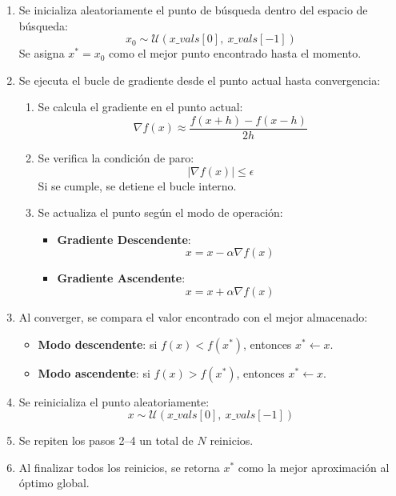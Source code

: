 \documentclass[11pt]{article}
\begin{document}
\begin{enumerate}
    \item Se inicializa aleatoriamente el punto de búsqueda dentro del espacio de búsqueda:
    \[
    x_0 \sim \mathcal{U}(x\_vals[0],\ x\_vals[-1])
    \]
    Se asigna $x^* = x_0$ como el mejor punto encontrado hasta el momento.

    \item Se ejecuta el bucle de gradiente desde el punto actual hasta convergencia:
    \begin{enumerate}
        \item Se calcula el gradiente en el punto actual:
        \[
        \nabla f(x) \approx \frac{f(x+h) - f(x-h)}{2h}
        \]
        \item Se verifica la condición de paro:
        \[
        |\nabla f(x)| \leq \epsilon
        \]
        Si se cumple, se detiene el bucle interno.
        \item Se actualiza el punto según el modo de operación:
        \begin{itemize}
            \item \textbf{Gradiente Descendente}:
            \[
            x = x - \alpha \nabla f(x)
            \]
            \item \textbf{Gradiente Ascendente}:
            \[
            x = x + \alpha \nabla f(x)
            \]
        \end{itemize}
    \end{enumerate}

    \item Al converger, se compara el valor encontrado con el mejor almacenado:
    \begin{itemize}
        \item \textbf{Modo descendente}: si $f(x) < f(x^*)$, entonces $x^* \leftarrow x$.
        \item \textbf{Modo ascendente}: si $f(x) > f(x^*)$, entonces $x^* \leftarrow x$.
    \end{itemize}

    \item Se reinicializa el punto aleatoriamente:
    \[
    x \sim \mathcal{U}(x\_vals[0],\ x\_vals[-1])
    \]

    \item Se repiten los pasos 2--4 un total de $N$ reinicios.

    \item Al finalizar todos los reinicios, se retorna $x^*$ como la mejor aproximación al óptimo global.
\end{enumerate}
\end{document}
